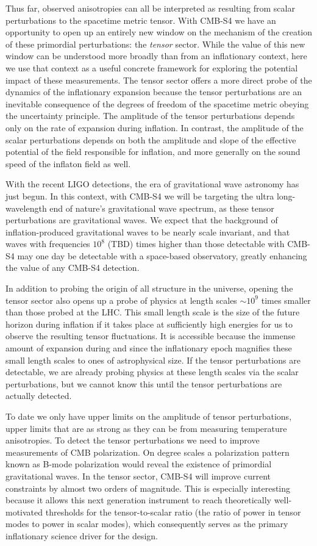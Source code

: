 Thus far, observed anisotropies can all be interpreted as resulting from scalar perturbations to the spacetime metric tensor.  With CMB-S4 we have an opportunity to open up an entirely new window on the mechanism of the creation of these primordial perturbations: the {\em tensor} sector. While the value of this new window can be understood more broadly than from an inflationary context, here we use that context as a useful concrete framework for exploring the potential impact of these measurements. The tensor sector offers a more direct probe of the dynamics of the inflationary expansion because the tensor perturbations are an inevitable consequence of the degrees of freedom of the spacetime metric obeying the uncertainty principle. The amplitude of the tensor perturbations depends only on the rate of expansion during inflation. In contrast, the amplitude of the scalar perturbations depends on both the amplitude and slope of the effective potential of the field responsible for inflation, and more generally on the sound speed of the inflaton field as well.

With the recent LIGO detections, the era of gravitational wave astronomy has just begun. In this context, with CMB-S4 we will be targeting the ultra long-wavelength end of nature's gravitational wave spectrum, as these tensor perturbations are gravitational waves. We expect that the background of inflation-produced gravitational waves to be nearly scale invariant, and that waves with frequencies $10^8$ (TBD) times higher than those detectable with CMB-S4 may one day be detectable with a space-based observatory, greatly enhancing the value of any CMB-S4 detection. 

In addition to probing the origin of all structure in the universe, opening the tensor sector also opens up a probe of physics at length scales $\sim 10^9$ times smaller than those probed at the LHC. This small length scale is the size of the future horizon during inflation if it takes place at sufficiently high energies for us to observe the resulting tensor fluctuations. It is accessible because the immense amount of expansion during and since the inflationary epoch magnifies
these small length scales to ones of astrophysical size. If the tensor perturbations are detectable, we are already probing physics at these length scales via the scalar perturbations, but we cannot know this until the tensor perturbations are actually detected.

To date we only have upper limits on the amplitude of tensor perturbations, upper limits that are as strong as they can be from measuring temperature anisotropies. To detect the tensor perturbations we need to improve measurements of CMB polarization. On degree scales a polarization pattern known as B-mode polarization would reveal the existence of primordial gravitational waves. In the tensor sector, CMB-S4 will improve current constraints by almost two orders of magnitude. This is especially interesting because it allows this next generation instrument to reach theoretically well-motivated thresholds for the tensor-to-scalar ratio (the ratio of power in tensor modes to power in scalar modes), which consequently serves as the primary inflationary science driver for the design. 

